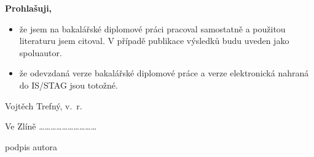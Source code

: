 {{	\bigskip
	
	
	\textbf{Prohlašuji,}
	
	\begin{itemize}
		\setlength{\parskip}{0pt}
		\setlength{\itemsep}{0pt}
		\item{že jsem na \ifbp bakalářské \else \ifdp diplomové \fi \fi práci pracoval samostatně a použitou literaturu jsem citoval. V případě publikace výsledků budu uveden jako spoluautor.}
		\item{že odevzdaná verze \ifbp bakalářské \else \ifdp diplomové \fi \fi práce a verze elektronická nahraná do IS/STAG jsou totožné.}
	\end{itemize}
	
	\bigskip
	\hspace{9.8cm}Vojtěch Trefný, v.~r.
	
	Ve Zlíně \hspace{7.2cm}\dots\dots\dots\dots\dots\dots\dots\dots\dots\dots
	
	\hspace{10.4cm}podpis autora
}}

